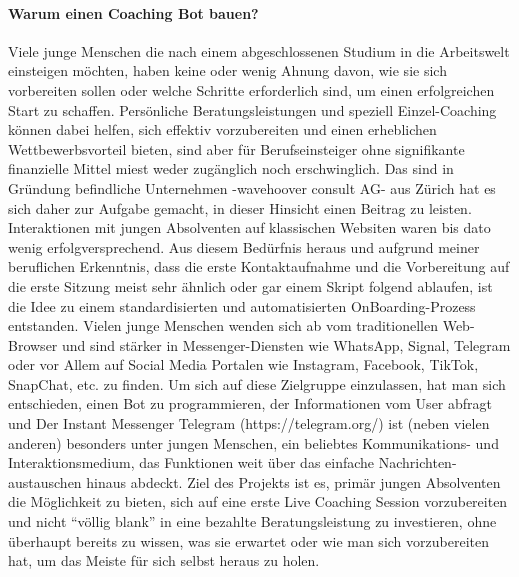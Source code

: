\paragraph{Warum einen Coaching Bot bauen?}
Viele junge Menschen die nach einem abgeschlossenen Studium in die Arbeitswelt einsteigen möchten, haben keine oder wenig Ahnung davon, wie sie sich vorbereiten sollen oder welche Schritte erforderlich sind, um einen erfolgreichen Start zu schaffen. Persönliche Beratungsleistungen und speziell Einzel-Coaching können dabei helfen, sich effektiv vorzubereiten und einen erheblichen Wettbewerbsvorteil bieten, sind aber für Berufseinsteiger ohne signifikante finanzielle Mittel miest weder zugänglich noch erschwinglich.
Das sind in Gründung befindliche Unternehmen -wavehoover consult AG- aus Zürich hat es sich daher zur Aufgabe gemacht, in dieser Hinsicht einen Beitrag zu leisten. Interaktionen mit jungen Absolventen auf klassischen Websiten waren bis dato wenig erfolgversprechend. 
Aus diesem Bedürfnis heraus und aufgrund meiner beruflichen Erkenntnis, dass die erste Kontaktaufnahme und die Vorbereitung auf die erste Sitzung meist sehr ähnlich oder gar einem Skript folgend ablaufen, ist die Idee zu einem standardisierten und automatisierten OnBoarding-Prozess entstanden.
Vielen junge Menschen wenden sich ab vom traditionellen Web-Browser und sind stärker in Messenger-Diensten wie WhatsApp, Signal, Telegram oder vor Allem auf Social Media Portalen wie Instagram, Facebook, TikTok, SnapChat, etc. zu finden. Um sich auf diese Zielgruppe einzulassen, hat man sich entschieden, einen Bot zu programmieren, der Informationen vom User abfragt und
Der Instant Messenger Telegram (https://telegram.org/) ist (neben vielen anderen) besonders unter jungen Menschen, ein beliebtes Kommunikations- und Interaktionsmedium, das Funktionen weit über das einfache Nachrichten-austauschen hinaus abdeckt.
Ziel des Projekts ist es, primär jungen Absolventen die Möglichkeit zu bieten, sich auf eine erste Live Coaching Session vorzubereiten und nicht “völlig blank” in eine bezahlte Beratungsleistung zu investieren, ohne überhaupt bereits zu wissen, was sie erwartet oder wie man sich vorzubereiten hat, um das Meiste für sich selbst heraus zu holen.

